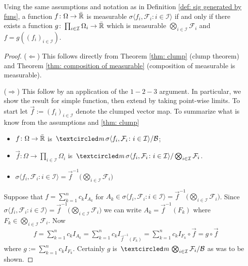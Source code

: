 \begin{theorem}
\label{thm: f = g(vec f)}
Using the same assumptions and notation as in Definition \ref{def: sig generated by funs},
a function $f\colon\Omega\rightarrow \bar{\Bbb R}$ is measurable $\sigma\langle  f_i, \mathcal F_i:i\in \mathcal I \rangle$ if and only if there exists a function $g\colon \prod_{i\in \mathcal I} \Omega_i\rightarrow \bar{\Bbb R}$ which is measurable $\bigotimes_{i\in\mathcal I}\mathcal F_i$ and  $f= g((f_{i})_{i\in\mathcal I})$.
\end{theorem}
\begin{proof}
($\Longleftarrow$) This follows directly from Theorem \ref{thm: clump} (clump theorem) and Theorem \ref{thm: composition of measurable} (composition of measurable is measurable).

($\Longrightarrow$) This follow by an application of the $1-2-3$ argument. In particular, we show the result for simple function, then extend by taking point-wise limits. To start let $\vec f := (f_i)_{i\in \mathcal I}$ denote the clumped vector map. To summarize what is know from the assumptions and  \ref{thm: clump}
\begin{itemize}
\item $f\colon \Omega \rightarrow \bar{\Bbb R}$ is $\mcirc \sigma\langle f_i, \mathcal F_i\colon i\in\mathcal I \rangle/\mathcal B$;
\item $\vec f\colon \Omega \rightarrow \prod_{i\in\mathcal I}\Omega_i$ is $\mcirc \sigma\langle f_i, \mathcal F_i\colon i\in\mathcal I \rangle/\bigotimes_{i\in \mathcal I} \mathcal F_i$.
\item $\sigma\langle f_i, \mathcal F_i\colon i\in\mathcal I \rangle = \vec f^{-1}\bigl(\bigotimes_{i\in \mathcal I} \mathcal F_i\bigr)$
\end{itemize}


Suppose that $f=\sum_{k=1}^n c_k I_{A_k}$ for $A_k\in \sigma\langle f_i, \mathcal F_i\colon i\in\mathcal I \rangle = \vec f^{-1}\bigl(\bigotimes_{i\in \mathcal I} \mathcal F_i\bigr)$. Since $\sigma\langle f_i, \mathcal F_i\colon i\in\mathcal I \rangle = \vec f^{-1}\bigl(\bigotimes_{i\in \mathcal I} \mathcal F_i\bigr)$ we can write $A_k= \vec f^{-1} (F_k)$ where $F_k\in \bigotimes_{i\in \mathcal I} \mathcal F_i$. Now
\begin{align*}
f=\sum_{k=1}^n c_k I_{A_k} =\sum_{k=1}^n c_k I_{\vec f^{-1} (F_k)} =\sum_{k=1}^n c_k I_{F_k} \circ \vec f= g \circ \vec f
\end{align*}
where $g:=\sum_{k=1}^n c_k I_{F_k}$.
Certainly $g$ is $\mcirc \bigotimes_{i\in \mathcal I} \mathcal F_i / \mathcal B$ as was to be shown.


\end{proof}
